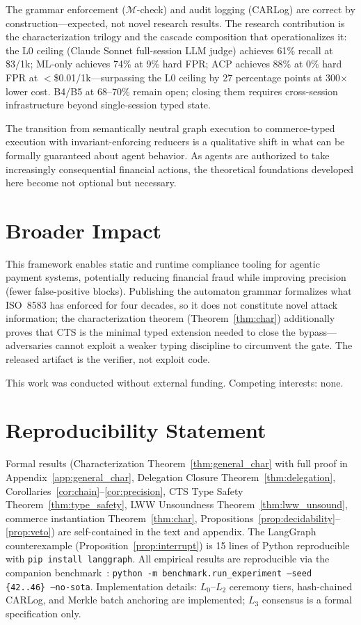 \documentclass{article}
\begin{document}
The grammar enforcement ($\mathcal{M}$-check) and audit logging (CARLog) are correct by construction---expected, not novel research results. The research contribution is the characterization trilogy and the cascade composition that operationalizes it: the L0 ceiling (Claude Sonnet full-session LLM judge) achieves 61\% recall at \$3/1k; ML-only achieves 74\% at 9\% hard FPR; ACP achieves 88\% at 0\% hard FPR at $<$\$0.01/1k---surpassing the L0 ceiling by 27 percentage points at 300$\times$ lower cost. B4/B5 at 68--70\% remain open; closing them requires cross-session infrastructure beyond single-session typed state.

The transition from semantically neutral graph execution to commerce-typed execution with invariant-enforcing reducers is a qualitative shift in what can be formally guaranteed about agent behavior. As agents are authorized to take increasingly consequential financial actions, the theoretical foundations developed here become not optional but necessary.

\section*{Broader Impact}

This framework enables static and runtime compliance tooling for agentic payment systems, potentially reducing financial fraud while improving precision (fewer false-positive blocks). Publishing the automaton grammar formalizes what ISO~8583 has enforced for four decades, so it does not constitute novel attack information; the characterization theorem (Theorem~\ref{thm:char}) additionally proves that CTS is the minimal typed extension needed to close the bypass---adversaries cannot exploit a weaker typing discipline to circumvent the gate. The released artifact is the verifier, not exploit code.

\begin{ack}
This work was conducted without external funding. Competing interests: none.
\end{ack}

\section*{Reproducibility Statement}

Formal results (Characterization Theorem~\ref{thm:general_char} with full proof in Appendix~\ref{app:general_char}, Delegation Closure Theorem~\ref{thm:delegation}, Corollaries~\ref{cor:chain}--\ref{cor:precision}, CTS Type Safety Theorem~\ref{thm:type_safety}, LWW Unsoundness Theorem~\ref{thm:lww_unsound}, commerce instantiation Theorem~\ref{thm:char}, Propositions~\ref{prop:decidability}--\ref{prop:veto}) are self-contained in the text and appendix. The LangGraph counterexample (Proposition~\ref{prop:interrupt}) is 15 lines of Python reproducible with \texttt{pip install langgraph}. All empirical results are reproducible via the companion benchmark~\cite{acpbench}: \texttt{python -m benchmark.run\_experiment --seed \{42..46\} --no-sota}. Implementation details: $L_0$--$L_2$ ceremony tiers, hash-chained CARLog, and Merkle batch anchoring are implemented; $L_3$ consensus is a formal specification only.
\end{document}
